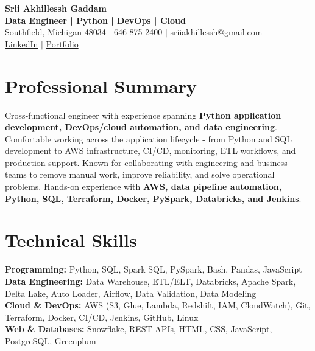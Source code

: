 \documentclass[letterpaper,10pt]{article}
\begin{document}
\fontsize{9.35pt}{10.45pt}\selectfont

\begin{center}
    {\LARGE \textbf{Srii Akhillessh Gaddam}} \\[-1pt]
    \textbf{Data Engineer | Python | DevOps | Cloud} \\[2pt]
    Southfield, Michigan 48034 $|$
    \href{tel:6468752400}{646-875-2400} $|$
    \href{mailto:sriiakhillessh@gmail.com}{sriiakhillessh@gmail.com} \\[1pt]
    \href{https://www.linkedin.com/in/srii-akhiilessh-gaddam-b48668191/}{LinkedIn} $|$
    \href{https://sriiakhillesshg.github.io/portfolio/}{Portfolio}
\end{center}
\vspace{-8pt}

\section{Professional Summary}
\small{Cross-functional engineer with experience spanning \textbf{Python application development, DevOps/cloud automation, and data engineering}. Comfortable working across the application lifecycle - from Python and SQL development to AWS infrastructure, CI/CD, monitoring, ETL workflows, and production support. Known for collaborating with engineering and business teams to remove manual work, improve reliability, and solve operational problems. Hands-on experience with \textbf{AWS, data pipeline automation, Python, SQL, Terraform, Docker, PySpark, Databricks, and Jenkins}.}

\section{Technical Skills}
\small{
\textbf{Programming:} Python, SQL, Spark SQL, PySpark, Bash, Pandas, JavaScript \\
\textbf{Data Engineering:} Data Warehouse, ETL/ELT, Databricks, Apache Spark, Delta Lake, Auto Loader, Airflow, Data Validation, Data Modeling \\
\textbf{Cloud \& DevOps:} AWS (S3, Glue, Lambda, Redshift, IAM, CloudWatch), Git, Terraform, Docker, CI/CD, Jenkins, GitHub, Linux \\
\textbf{Web \& Databases:} Snowflake, REST APIs, HTML, CSS, JavaScript, PostgreSQL, Greenplum
}
\end{document}
